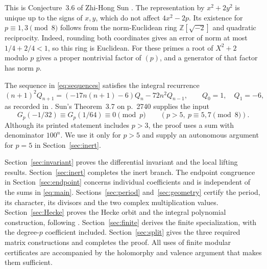 \documentclass[11pt,a4paper]{article}
\theoremstyle{remark}
\newcommand{\Z}{\mathbb Z}\newcommand{\Q}{\mathbb Q}
\begin{document}
This is Conjecture~3.6 of Zhi-Hong Sun
\cite[p.~2742]{sun}. The representation by $x^2+2y^2$ is unique up to
the signs of $x,y$, which do not affect $4x^2-2p$.
Its existence for $p\equiv1,3\pmod8$ follows from the norm-Euclidean
ring $\Z[\sqrt{-2}]$ and quadratic reciprocity.
Indeed, rounding both coordinates gives an error of norm at most
$1/4+2/4<1$, so this ring is Euclidean. For these primes a root of
$X^2+2$ modulo $p$ gives a proper nontrivial factor of $(p)$, and a
generator of that factor has norm $p$.

The sequence in \eqref{eq:sequences} satisfies the integral recurrence
\begin{equation}\label{eq:Q-recurrence}
 (n+1)^2Q_{n+1}=(-17n(n+1)-6)Q_n-72n^2Q_{n-1},
 \qquad Q_0=1,\quad Q_1=-6,
\end{equation}
as recorded in \cite[pp.~2729--2730]{sun}.
Sun's Theorem~3.7 on p.~2740 supplies the input
\begin{equation}\label{eq:Sun-input}
 G_p(-1/32)\equiv G_p(1/64)\equiv0\pmod p
 \qquad(p>5,\ p\equiv5,7\pmod8).
\end{equation}
Although its printed statement includes $p>3$, the proof uses a sum
with denominator $100^n$. We use it only for $p>5$ and supply an
autonomous argument for $p=5$ in Section~\ref{sec:inert}.

Section~\ref{sec:invariant} proves the differential invariant and the
local lifting results. Section~\ref{sec:inert} completes the inert branch.
The endpoint congruence in Section~\ref{sec:endpoint} concerns individual
coefficients and is independent of the sums in \eqref{eq:main}.
Sections~\ref{sec:period} and~\ref{sec:geometry} certify the period,
its character, its divisors and the two complex multiplication values.
Section~\ref{sec:Hecke} proves the Hecke orbit and the integral polynomial
construction, following \cite[Lemma~3.7 and Section~5]{beukers}.
Section~\ref{sec:finite} derives the finite specialization, with the
degree-$p$ coefficient included. Section~\ref{sec:split} gives the
three required matrix constructions and completes the proof.
All uses of finite modular certificates are accompanied by the
holomorphy and valence argument that makes them sufficient.
\end{document}
